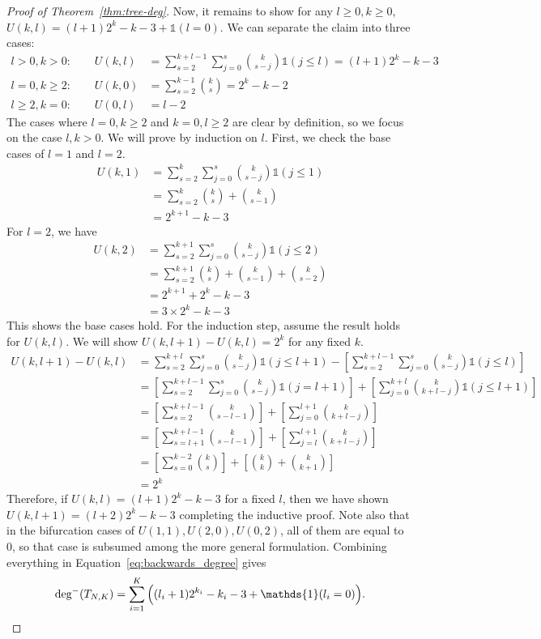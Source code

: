 \documentclass{article}
\begin{document}
\begin{proof}[Proof of Theorem~\ref{thm:tree-deg}]
\noindent Now, it remains to show for any $l\geq 0, k \geq 0$, $U(k,l) = (l+1)2^k -k-3 + \mathds{1}(l=0)$. We can separate the claim into three cases: 
\begin{align*}
    l>0, k>0: \qquad U(k,l) & = \sum_{s=2}^{k+l-1} \sum_{j=0}^s  \binom{k}{s-j} \mathds{1}(j \leq l ) = (l+1) 2^k -k-3 \\ 
    l=0, k\geq 2: \qquad U(k,0) &= \sum_{s=2}^{k-1} \binom{k}{s} = 2^k-k-2 \\
    l\geq 2, k=0: \qquad U(0,l) &= l-2
\end{align*}
The cases where $l=0, k\geq 2$ and $k=0, l\geq 2$ are clear by definition, so we focus on the case $l, k>0$. We will prove by induction on $l$. First, we check the base cases of $l=1$ and $l=2$. 
\begin{align*}
    U(k, 1) &= \sum_{s=2}^{k} \sum_{j=0}^s \binom{k}{s-j} \mathds{1}(j \leq 1) \\
    &= \sum_{s=2}^{k} \binom{k}{s} + \binom{k}{s-1} \\
    &= 2^{k+1}-k-3
\end{align*}
For $l=2$, we have 
\begin{align*}
    U(k, 2) &= \sum_{s=2}^{k+1} \sum_{j=0}^s \binom{k}{s-j} \mathds{1}(j \leq 2) \\
    &= \sum_{s=2}^{k+1} \binom{k}{s} + \binom{k}{s-1} + \binom{k}{s-2} \\ 
    &= 2^{k+1} + 2^{k} -k-3 \\
    &= 3 \times 2^k -k-3
\end{align*}
This shows the base cases hold. For the induction step, assume the result holds for $U(k,l)$. We will show $U(k,l+1) - U(k,l) = 2^k$ for any fixed $k$. 
\begin{align*}
    U(k,l+1) - U(k,l) &= \sum_{s=2}^{k+l} \sum_{j=0}^s  \binom{k}{s-j} \mathds{1}(j \leq l+1 ) - \left [ \sum_{s=2}^{k+l-1} \sum_{j=0}^s  \binom{k}{s-j} \mathds{1}(j \leq l )\right ] \\
    &= \left [ \sum_{s=2}^{k+l-1} \sum_{j=0}^s  \binom{k}{s-j} \mathds{1}(j = l+1 )\right ] + \left [\sum_{j=0}^{k+l}  \binom{k}{k+l-j} \mathds{1}(j \leq l+1) \right ] \\
    &=\left [ \sum_{s=2}^{k+l-1} \binom{k}{s-l-1} \right ] +\left [ \sum_{j=0}^{l+1}  \binom{k}{k+l-j} \right ]\\
    &= \left [\sum_{s=l+1}^{k+l-1} \binom{k}{s-l-1}\right ] + \left [\sum_{j=l}^{l+1}  \binom{k}{k+l-j} \right ]\\
    &= \left [ \sum_{s=0}^{k-2} \binom{k}{s}\right ] + \left [\binom{k}{k} + \binom{k}{k+1} \right ] \\
    &= 2^k
\end{align*}
Therefore, if $U(k,l) = (l+1)2^k -k-3$ for a fixed $l$, then we have shown $U(k,l+1) = (l+2) 2^k-k-3$ completing the inductive proof. Note also that in the bifurcation cases of $U(1,1), U(2,0), U(0,2)$, all of them are equal to 0, so that case is subsumed among the more general formulation. Combining everything in Equation~\ref{eq:backwards_degree} gives \[ \text{deg}^-(T_{N,K}) = \sum_{i=1}^K \Big ((l_i+1)2^{k_i} -k_i-3 + \mathds{1}(l_i=0) \Big ). \qedhere\]
\end{proof}
\end{document}
